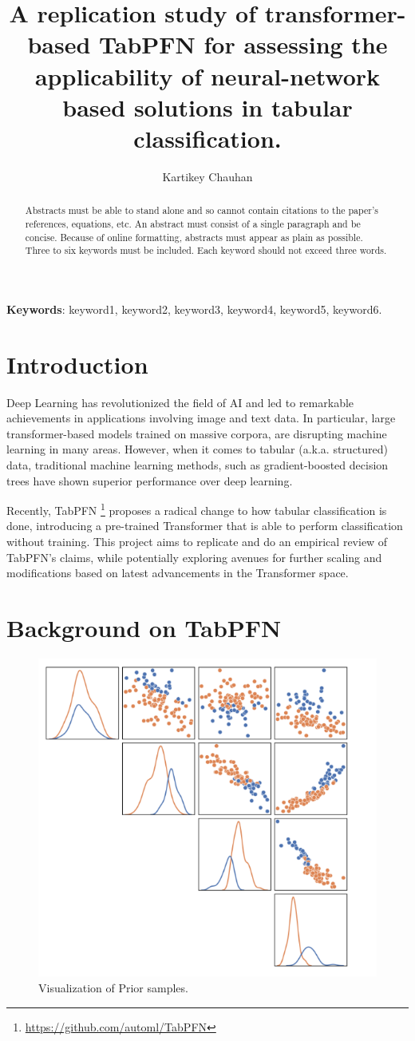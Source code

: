 \documentclass[a4paper]{article}
\title{A replication study of transformer-based TabPFN for assessing the applicability of neural-network based solutions in tabular classification.}
\author[1]{Kartikey Chauhan}
\affil[1]{\small Data Science \& Analytics, Toronto Metropolitan University}
\date{}  %
\begin{document}
\maketitle

\begin{abstract}
Abstracts must be able to stand alone and so cannot contain citations to the paper’s references, equations, etc. An abstract must consist of a single paragraph and be concise. Because of online formatting, abstracts must appear as plain as possible. Three to six keywords must be included. Each keyword should not exceed three words. %
\end{abstract}

\textbf{Keywords}: keyword1, keyword2, keyword3, keyword4, keyword5, keyword6.  

\section{Introduction}

Deep Learning has revolutionized the field of AI and led to remarkable achievements in applications involving image and text data. In particular, large transformer-based models trained on massive corpora, are disrupting machine learning in many areas. However, when it comes to tabular (a.k.a. structured) data, traditional machine learning methods, such as gradient-boosted decision trees have shown superior performance over deep learning. 

Recently, TabPFN \footnote{\url{https://github.com/automl/TabPFN}} proposes a radical change to how tabular classification is done, introducing a pre-trained Transformer that is able to perform classification without training. This project aims to replicate and do an empirical review of TabPFN's claims, while potentially exploring avenues for further scaling and modifications based on latest advancements in the Transformer space.

\section{Background on TabPFN}\label{sec2}


\begin{figure}[!ht]
  \centering
  \includegraphics[width=0.4\linewidth]{figures/priors_visualized.png}
  \caption{\label{fig:priors} Visualization of Prior samples.}
  \end{figure}
\end{document}
